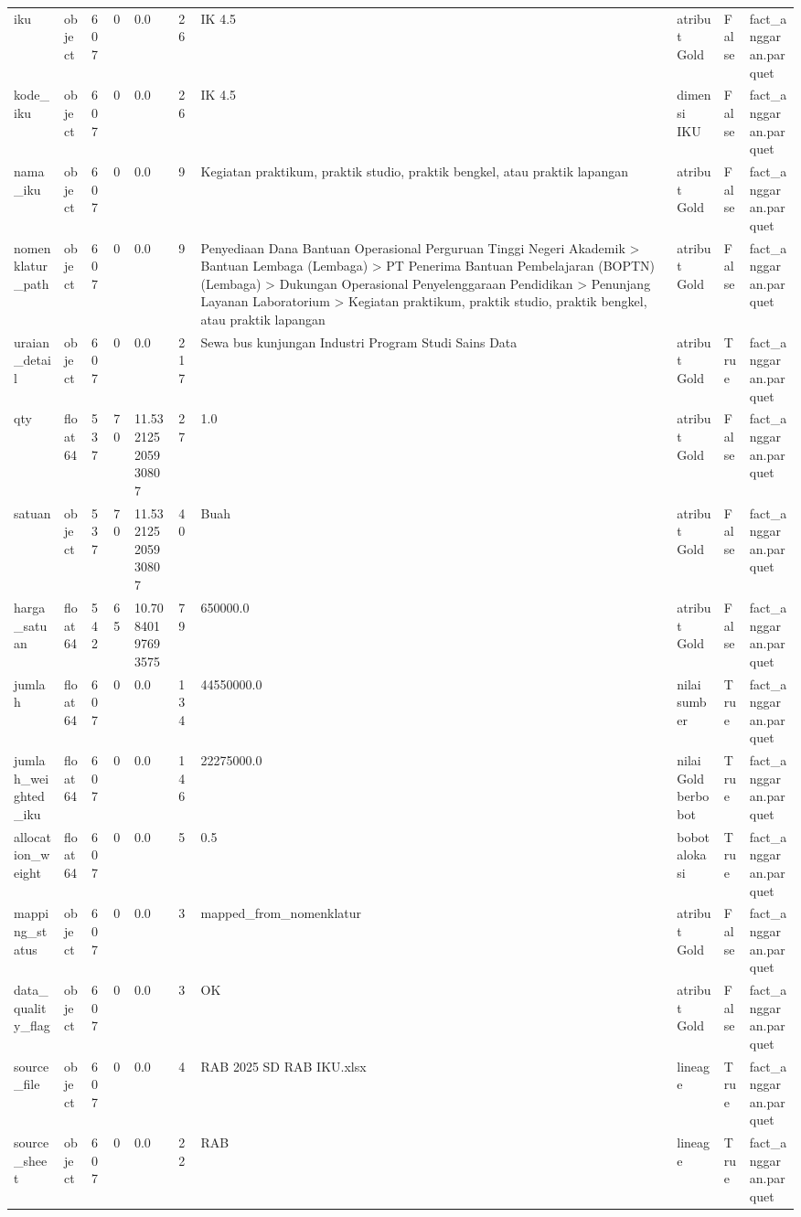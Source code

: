 \begin{longtable}{llllllllll}
iku & object & 607 & 0 & 0.0 & 26 & IK 4.5 & atribut Gold & False & fact\_anggaran.parquet \\
kode\_iku & object & 607 & 0 & 0.0 & 26 & IK 4.5 & dimensi IKU & False & fact\_anggaran.parquet \\
nama\_iku & object & 607 & 0 & 0.0 & 9 & Kegiatan praktikum, praktik studio, praktik bengkel, atau praktik lapangan & atribut Gold & False & fact\_anggaran.parquet \\
nomenklatur\_path & object & 607 & 0 & 0.0 & 9 & Penyediaan Dana Bantuan Operasional Perguruan Tinggi Negeri Akademik > Bantuan Lembaga (Lembaga) > PT Penerima Bantuan Pembelajaran (BOPTN) (Lembaga) > Dukungan Operasional Penyelenggaraan Pendidikan > Penunjang Layanan Laboratorium > Kegiatan praktikum, praktik studio, praktik bengkel, atau praktik lapangan & atribut Gold & False & fact\_anggaran.parquet \\
uraian\_detail & object & 607 & 0 & 0.0 & 217 & Sewa bus kunjungan Industri Program Studi Sains Data & atribut Gold & True & fact\_anggaran.parquet \\
qty & float64 & 537 & 70 & 11.532125205930807 & 27 & 1.0 & atribut Gold & False & fact\_anggaran.parquet \\
satuan & object & 537 & 70 & 11.532125205930807 & 40 & Buah & atribut Gold & False & fact\_anggaran.parquet \\
harga\_satuan & float64 & 542 & 65 & 10.70840197693575 & 79 & 650000.0 & atribut Gold & False & fact\_anggaran.parquet \\
jumlah & float64 & 607 & 0 & 0.0 & 134 & 44550000.0 & nilai sumber & True & fact\_anggaran.parquet \\
jumlah\_weighted\_iku & float64 & 607 & 0 & 0.0 & 146 & 22275000.0 & nilai Gold berbobot & True & fact\_anggaran.parquet \\
allocation\_weight & float64 & 607 & 0 & 0.0 & 5 & 0.5 & bobot alokasi & True & fact\_anggaran.parquet \\
mapping\_status & object & 607 & 0 & 0.0 & 3 & mapped\_from\_nomenklatur & atribut Gold & False & fact\_anggaran.parquet \\
data\_quality\_flag & object & 607 & 0 & 0.0 & 3 & OK & atribut Gold & False & fact\_anggaran.parquet \\
source\_file & object & 607 & 0 & 0.0 & 4 & RAB 2025 SD RAB IKU.xlsx & lineage & True & fact\_anggaran.parquet \\
source\_sheet & object & 607 & 0 & 0.0 & 22 & RAB & lineage & True & fact\_anggaran.parquet \\

\end{longtable}
